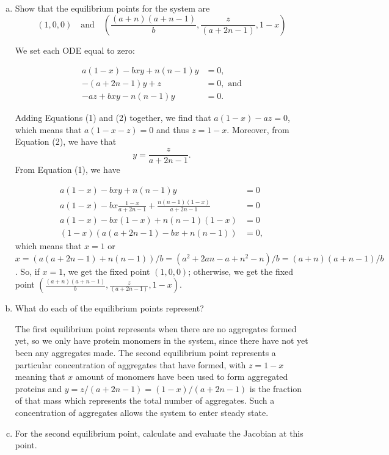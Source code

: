 \documentclass[11pt]{amsart}
\begin{document}
\begin{enumerate}[a)]
\item Show that the equilibrium points for the system are
$$ (1,0,0) \quad\text{and}\quad \left(\frac{(a+n)(a+n-1)}{b}, \frac{z}{(a+2n-1)}, 1-x\right) $$ 

 We set each ODE equal to zero:

\begin{align} 
a(1-x) - bxy + n(n-1)y &=0, \\ 
-(a+2n-1)y + z &=0, \text{ and} \\ 
-az + bxy - n(n-1)y &=0. 
\end{align}

Adding Equations (1) and (2) together, we find that $a(1-x)-az=0$, which means that $a(1-x-z)=0$ and thus $z=1-x$. Moreover, from Equation (2), we have that $$ y = \frac{z}{a+2n-1}.$$ From Equation (1), we have 

\begin{align*} a(1-x)-bxy+n(n-1)y &= 0 \\ 
a(1-x)-bx \frac{1-x}{a+2n-1}+\frac{n(n-1)(1-x)}{a+2n-1} &=0 \\ 
a(1-x)-bx (1-x)+n(n-1)(1-x) &=0 \\ 
(1-x) (a(a+2n-1)-bx+n(n-1)) &=0, 
\end{align*} 
which means that $x=1$ or $x = (a(a+2n-1)+n(n-1))/b = (a^2+2an-a+n^2-n)/b = (a+n)(a+n-1)/b$.
So, if $x=1$, we get the fixed point $(1,0,0)$; otherwise, we get the fixed point $\left(\frac{(a+n)(a+n-1)}{b}, \frac{z}{(a+2n-1)}, 1-x\right)$.

\item What do each of the equilibrium points represent?

 The first equilibrium point represents when there are no aggregates formed yet, so we only have protein monomers in the system, since there have not yet been any aggregates made. The second equilibrium point represents a particular concentration of aggregates that have formed, with $z=1-x$ meaning that $x$ amount of monomers have been used to form aggregated proteins and $y = z/(a+2n-1) = (1-x)/(a+2n-1)$ is the fraction of that mass which represents the total number of aggregates. Such a concentration of aggregates allows the system to enter steady state.

\item For the second equilibrium point, calculate and evaluate the Jacobian at this point.


\end{enumerate}
\end{document}
